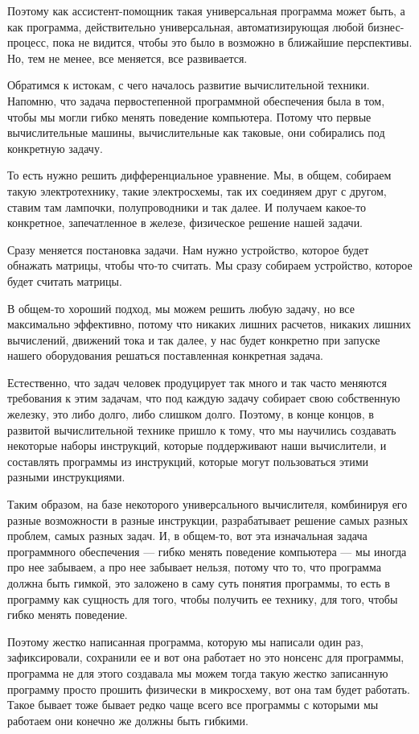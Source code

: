Поэтому как ассистент-помощник такая универсальная программа может быть, а как программа, действительно универсальная, автоматизирующая любой бизнес-процесс, пока не видится, чтобы это было в возможно в ближайшие перспективы. Но, тем не менее, все меняется, все развивается.

Обратимся к истокам, с чего началось развитие вычислительной техники. Напомню, что задача первостепенной программной обеспечения была в том, чтобы мы могли гибко менять поведение компьютера. Потому что первые вычислительные машины, вычислительные как таковые, они собирались под конкретную задачу. 

То есть нужно решить дифференциальное уравнение. Мы, в общем, собираем такую электротехнику, такие электросхемы, так их соединяем друг с другом, ставим там лампочки, полупроводники и так далее. И получаем какое-то конкретное, запечатленное в железе, физическое решение нашей задачи. 

Сразу меняется постановка задачи. Нам нужно устройство, которое будет обнажать матрицы, чтобы что-то считать. Мы сразу собираем устройство, которое будет считать матрицы. 

В общем-то хороший подход, мы можем решить любую задачу, но все максимально эффективно, потому что никаких лишних расчетов, никаких лишних вычислений, движений тока и так далее, у нас будет конкретно при запуске нашего оборудования решаться поставленная конкретная задача.

Естественно, что задач человек продуцирует так много и так часто меняются требования к этим задачам, что под каждую задачу собирает свою собственную железку, это либо долго, либо слишком долго. Поэтому, в конце концов, в развитой вычислительной технике пришло к тому, что мы научились создавать некоторые наборы инструкций, которые поддерживают наши вычислители, и составлять программы из инструкций, которые могут пользоваться этими разными инструкциями. 

Таким образом, на базе некоторого универсального вычислителя, комбинируя его разные возможности в разные инструкции, разрабатывает решение самых разных проблем, самых разных задач. И, в общем-то, вот эта изначальная задача программного обеспечения --- гибко менять поведение компьютера --- мы иногда про нее забываем, а про нее забывает нельзя, потому что то, что программа должна быть гимкой, это заложено в саму суть понятия программы, то есть в программу как сущность для того, чтобы получить ее технику, для того, чтобы гибко менять поведение.

Поэтому жестко написанная программа, которую мы написали один раз, зафиксировали, сохранили ее и вот она работает но это нонсенс для программы, программа не для этого создавала мы можем тогда такую жестко записанную программу просто прошить физически в микросхему, вот она там будет работать. Такое бывает тоже бывает редко чаще всего все программы с которыми мы работаем они конечно же должны быть гибкими.

